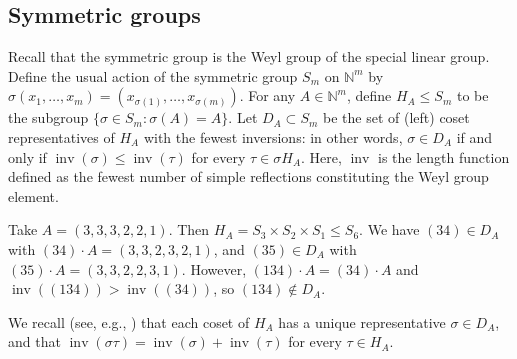\documentclass[pdftex]{sigma}
\numberwithin{equation}{section}
\DeclareMathOperator{\inv}{inv}
\begin{document}
\subsection{Symmetric groups}
Recall that the symmetric group is the Weyl group of the special linear group. Define the usual action of the symmetric group $S_m$ on $\mathbb{N}^m$ by $ \sigma(x_1,\dots,x_m)= (x_{\sigma(1)}, \dots, x_{\sigma(m)})$. For any $A\in \mathbb{N}^m$, define $ H_A \le S_m $ to be the subgroup $ \{\sigma \in S_m\colon \sigma(A)=A\}$. Let $ D_A \subset S_m $ be the set of (left) coset representatives of $H_A$ with the fewest inversions: in other words, $ \sigma \in D_A $ if and only if $ \inv (\sigma) \le \inv (\tau) $ for every $ \tau \in \sigma H_A$. Here, $\inv$ is the length function defined as the fewest number
of simple reflections constituting the Weyl group element.

 \begin{Example} Take $ A= (3,3,3,2,2,1).$ Then $H_A=S_3 \times S_2 \times S_1 \leq S_6$. We have $ (34) \in D_A $ with $ (34) \cdot A= (3,3,2,3,2,1)$, and $ (35) \in D_A $ with $ (35)\cdot A=(3,3,2,2,3,1) $. However, $ (134)\cdot A= (34) \cdot A$ and $\inv((134)) > \inv((34))$, so $ (134) \notin D_A $.
 \end{Example}

 We recall (see, e.g., \cite{Carter}) that each coset of $H_A$ has a unique representative $\sigma \in D_A$, and that $\inv(\sigma\tau) = \inv(\sigma) + \inv(\tau)$ for every $\tau \in H_A$.
\end{document}
